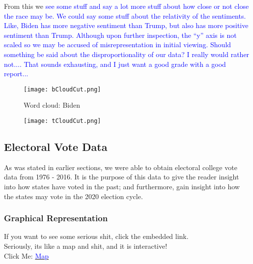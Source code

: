 \documentclass[11pt, oneside]{article}
\begin{document}
From this we \textcolor{blue}{see some stuff and say a lot more stuff about how close or not close the race may be. We could say some stuff about the relativity of the sentiments. Like, Biden has more negative sentiment than Trump, but also has more positive sentiment than Trump. Although upon further inspection, the ``y'' axis is not scaled so we may be accused of misrepresentation in initial viewing. Should something be said about the disproportionality of our data? I really would rather not.... That sounds exhausting, and I just want a good grade with a good report...}


\begin{wrapfigure}[]{R}{0.3\textwidth}
\vspace{-0.55cm}
\texttt{[image: bCloudCut.png]}
\caption{\small{Word cloud: Biden}}
\vspace{-.55cm}
\end{wrapfigure}


\begin{wrapfigure}[]{R}{0.25\textwidth}
\vspace{-0.55cm}
\texttt{[image: tCloudCut.png]}
\vspace{-.55cm}
\end{wrapfigure}



\subsection{Electoral Vote Data}
As was stated in earlier sections, we were able to obtain electoral college vote data from 1976 - 2016. It is the purpose of this data to give the reader insight into how states have voted in the past; and furthermore, gain insight into how the states may vote in the 2020 election cycle.
 
\subsubsection{Graphical Representation}
If you want to see some serious shit, click the embedded link.\\
Seriously, its like a map and shit, and it is interactive!\\
Click Me: \href{https://public.tableau.com/profile/kursten.reznik#!/vizhome/Twitter_Project_16041047339100/DemographicDashboard}{\textcolor{blue}{Map}}\\
\end{document}
